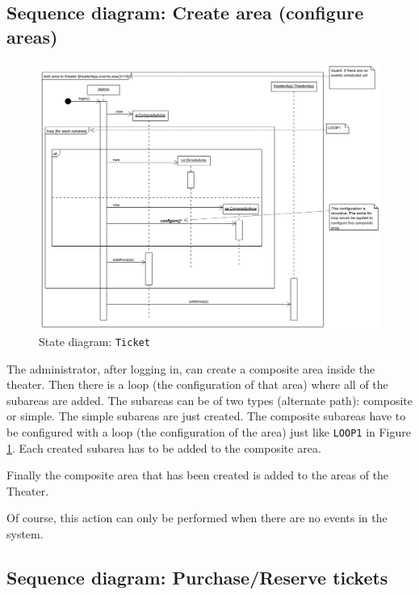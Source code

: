 \documentclass{article}
\begin{document}
\subsection{Sequence diagram: Create area (configure areas)}

\begin{figure}[h]
    \centering
    \includegraphics[width=450pt]{../sequence_area/addArea}
    \caption{State diagram: \texttt{Ticket}}\label{seq}
\end{figure}

The administrator, after logging in, can create a composite area inside the theater. Then there is a loop (the configuration of that area) where all of the subareas are added. The subareas can be of two types (alternate path): composite or simple. The simple subareas are just created. The composite subareas have to be configured with a loop (the configuration of the area) just like  \texttt{LOOP1} in Figure \ref{seq}. Each created subarea has to be added to the composite area.

Finally the composite area that has been created is added to the areas of the Theater.

Of course, this action can only be performed when there are no events in the system.

\newpage

\subsection{Sequence diagram: Purchase/Reserve tickets}
\end{document}
